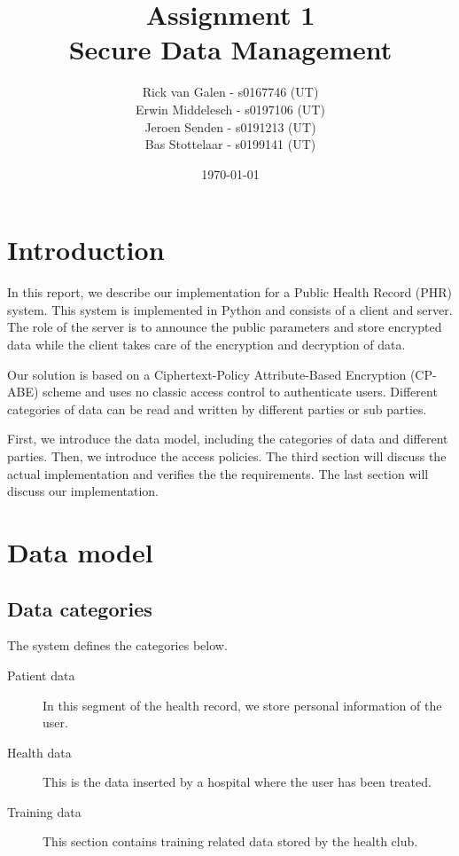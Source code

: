 \documentclass[a4paper]{article}
\begin{document}
\title{Assignment 1 \\ Secure Data Management}
\author{Rick van Galen - s0167746 (UT) \\ Erwin Middelesch - s0197106 (UT) \\ Jeroen Senden - s0191213 (UT) \\ Bas Stottelaar - s0199141 (UT)}
\date{\today}
\maketitle

\section{Introduction}
	In this report, we describe our implementation for a Public Health Record (PHR) system. This system is implemented in Python and consists of a client and server. The role of the server is to announce the public parameters and store encrypted data while the client takes care of the encryption and decryption of data.

	Our solution is based on a Ciphertext-Policy Attribute-Based Encryption (CP-ABE) scheme and uses no classic access control to authenticate users. Different categories of data can be read and written by different parties or sub parties.
	
	First, we introduce the data model, including the categories of data and different parties. Then, we introduce the access policies. The third section will discuss the actual implementation and verifies the the requirements. The last section will discuss our implementation.

\section{Data model}

	\subsection{Data categories}
		The system defines the categories below. 
		
		\begin{description}
		    \item[Patient data]
		    In this segment of the health record, we store personal information of the user. 
		    \item[Health data]
		    This is the data inserted by a hospital where the user has been treated.
		    \item[Training data]
		    This section contains training related data stored by the health club.
		\end{description}
		
\end{document}
